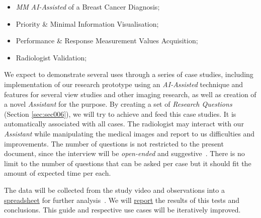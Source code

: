 \begin{itemize}
\item {\it \gls{MM}} \textit{AI-Assisted} of a Breast Cancer Diagnosis;
\item Priority \& Minimal Information Visualisation;
\item Performance \& Response Measurement Values Acquisition;
\item Radiologist Validation;
\end{itemize}


We expect to demonstrate several uses through a series of case studies, including implementation of our research prototype using an \textit{AI-Assisted} technique and features for several view studies and other imaging research, as well as creation of a novel \textit{Assistant} for the purpose. By creating a set of {\it Research Questions} (Section \ref{sec:sec006}), we will try to achieve and feed this case studies. It is automatically associated with all cases. The radiologist may interact with our \textit{Assistant} while manipulating the medical images and report to us difficulties and improvements. The number of questions is not restricted to the present document, since the interview will be {\it open-ended} and suggestive~\cite{joyce2017healthcare}. There is no limit to the number of questions that can be asked per case but it should fit the amount of expected time per each.

The data will be collected from the study video and observations into a \hyperlink{https://docs.google.com/spreadsheets/d/1CoPLONnINdBWryGs7SBRuPZA-DnQ0t_yzx3u8ym0UoI/edit?usp=sharing}{spreadsheet} for further analysis~\cite{carayon2015systematic}. We will \hyperlink{https://github.com/mida-project/research-reports}{report} the results of this tests and conclusions. This guide and respective use cases will be iteratively improved.

